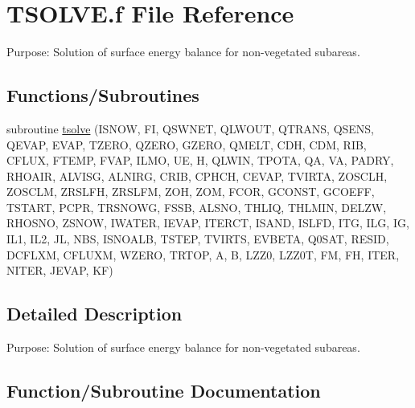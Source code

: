 \hypertarget{TSOLVE_8f}{}\section{T\+S\+O\+L\+V\+E.\+f File Reference}
\label{TSOLVE_8f}


Purpose\+: Solution of surface energy balance for non-\/vegetated subareas.  


\subsection*{Functions/\+Subroutines}
\begin{DoxyCompactItemize}
\item 
subroutine \hyperlink{TSOLVE_8f_afed2fb96199ad1f2aeed9442633cd53f}{tsolve} (I\+S\+N\+O\+W, F\+I, Q\+S\+W\+N\+E\+T, Q\+L\+W\+O\+U\+T, Q\+T\+R\+A\+N\+S, Q\+S\+E\+N\+S, Q\+E\+V\+A\+P, E\+V\+A\+P, T\+Z\+E\+R\+O, Q\+Z\+E\+R\+O, G\+Z\+E\+R\+O, Q\+M\+E\+L\+T, C\+D\+H, C\+D\+M, R\+I\+B, C\+F\+L\+U\+X, F\+T\+E\+M\+P, F\+V\+A\+P, I\+L\+M\+O, U\+E, H, Q\+L\+W\+I\+N, T\+P\+O\+T\+A, Q\+A, V\+A, P\+A\+D\+R\+Y, R\+H\+O\+A\+I\+R, A\+L\+V\+I\+S\+G, A\+L\+N\+I\+R\+G, C\+R\+I\+B, C\+P\+H\+C\+H, C\+E\+V\+A\+P, T\+V\+I\+R\+T\+A, Z\+O\+S\+C\+L\+H, Z\+O\+S\+C\+L\+M, Z\+R\+S\+L\+F\+H, Z\+R\+S\+L\+F\+M, Z\+O\+H, Z\+O\+M, F\+C\+O\+R, G\+C\+O\+N\+S\+T, G\+C\+O\+E\+F\+F, T\+S\+T\+A\+R\+T, P\+C\+P\+R, T\+R\+S\+N\+O\+W\+G, F\+S\+S\+B, A\+L\+S\+N\+O, T\+H\+L\+I\+Q, T\+H\+L\+M\+I\+N, D\+E\+L\+Z\+W, R\+H\+O\+S\+N\+O, Z\+S\+N\+O\+W, I\+W\+A\+T\+E\+R, I\+E\+V\+A\+P, I\+T\+E\+R\+C\+T, I\+S\+A\+N\+D, I\+S\+L\+F\+D, I\+T\+G, I\+L\+G, I\+G, I\+L1, I\+L2, J\+L, N\+B\+S, I\+S\+N\+O\+A\+L\+B, T\+S\+T\+E\+P, T\+V\+I\+R\+T\+S, E\+V\+B\+E\+T\+A, Q0\+S\+A\+T, R\+E\+S\+I\+D, D\+C\+F\+L\+X\+M, C\+F\+L\+U\+X\+M, W\+Z\+E\+R\+O, T\+R\+T\+O\+P, A, B, L\+Z\+Z0, L\+Z\+Z0\+T, F\+M, F\+H, I\+T\+E\+R, N\+I\+T\+E\+R, J\+E\+V\+A\+P, K\+F)
\end{DoxyCompactItemize}


\subsection{Detailed Description}
Purpose\+: Solution of surface energy balance for non-\/vegetated subareas. 



\subsection{Function/\+Subroutine Documentation}
\hypertarget{TSOLVE_8f_afed2fb96199ad1f2aeed9442633cd53f}{}
